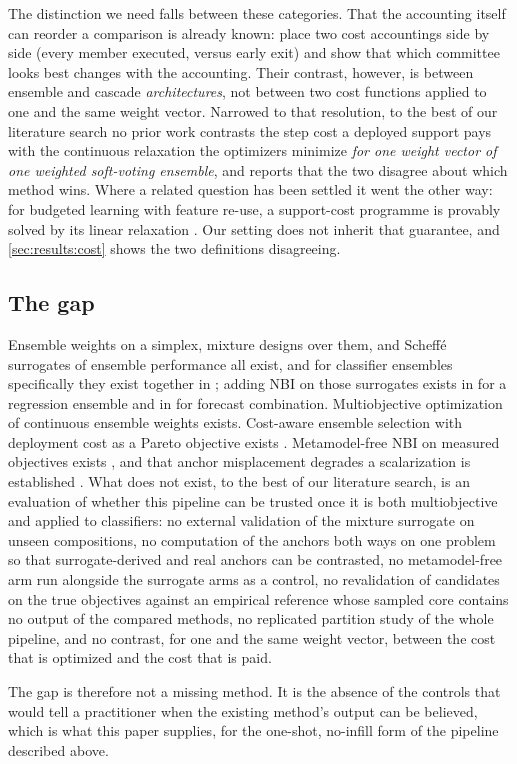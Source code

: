 The distinction we need falls between these categories. That the accounting itself can reorder a comparison is
already known: \citet{wang2022committees} place two cost accountings side by side (every member executed, versus
early exit) and show that which committee looks best changes with the accounting. Their contrast, however, is
between ensemble and cascade \emph{architectures}, not between two cost functions applied to one and the same weight
vector. Narrowed to that resolution, to the best of our literature search no prior work contrasts the step cost a
deployed support pays with the continuous relaxation the optimizers minimize \emph{for one weight vector of one
weighted soft-voting ensemble}, and reports that the two disagree about which method wins. Where a related question
has been settled it went the other way: for budgeted learning with feature re-use, a support-cost programme is
provably solved by its linear relaxation \citep{nan2016pruning}. Our setting does not
inherit that guarantee, and \cref{sec:results:cost} shows the two definitions disagreeing.

\subsection{The gap}
\label{sec:rel:gap}

Ensemble weights on a simplex, mixture designs over them, and Scheffé surrogates of ensemble performance all exist,
and for classifier ensembles specifically they exist together in \citet{kwon2024ensemble}; adding NBI on those
surrogates exists in \citet{rocha2025ensemblestlf} for a regression ensemble and in \citet{bacci2019nbi_mixture} for
forecast combination. Multiobjective optimization of continuous ensemble weights exists. Cost-aware ensemble selection
with deployment cost as a Pareto objective exists \citep{maier2024hardware,maier2026hapens}. Metamodel-free NBI on
measured objectives exists \citep{gellerich2023doenbi}, and that anchor misplacement degrades a scalarization is
established \citep{isermann1988payoff,deb2010nadir,herrmann2026nonextreme}. What does not exist, to the best of our
literature search, is an evaluation of whether this pipeline can be trusted once it is both multiobjective and applied
to classifiers: no external validation of the mixture surrogate on unseen compositions, no computation of the anchors
both ways on one problem so that surrogate-derived and real anchors can be contrasted, no metamodel-free arm run
alongside the surrogate arms as a control, no revalidation of candidates on the true objectives against an
empirical reference whose sampled core contains no output of the compared methods, no replicated partition study of the whole pipeline, and no
contrast, for one and the same weight vector, between the cost that is optimized and the cost that is paid.

The gap is therefore not a missing method. It is the absence of the controls that would tell a practitioner when the
existing method's output can be believed, which is what this paper supplies, for the one-shot, no-infill form of
the pipeline described above.
